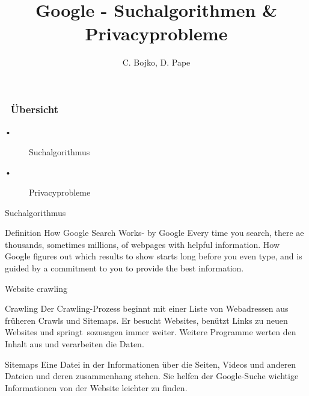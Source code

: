 \documentclass[11pt]{beamer}
\begin{document}
    \author{C. Bojko, D. Pape}
    \title{\textbf{Google - Suchalgorithmen \& Privacyprobleme}}
    \frame[plain]{\maketitle}
    
\begin {frame}
        \frametitle{\ Übersicht}

\begin{description}
\item[•]Suchalgorithmus
\item[•]Privacyprobleme
\end{description}
\end{frame}

\begin{frame}{Suchalgorithmus}

    \begin{block}{Definition \dq How Google Search Works\dq - by Google}
    \dq Every time you search, there ae thousands, sometimes millions, of webpages with helpful information. How Google figures out which results to show starts long before you even type, and is guided by a commitment to you to provide the best information.\dq
    \end{block}
    
\end{frame}

\begin{frame}{Website \dq crawling\dq}
    \begin{block}{Crawling}
        Der Crawling-Prozess beginnt mit einer Liste von Webadressen aus früheren Crawls und Sitemaps. Er besucht Websites, benützt Links zu neuen Websites und \dq springt\dq\  sozusagen immer weiter. Weitere Programme werten den Inhalt aus und verarbeiten die Daten.
    \end{block}
    \begin{alertblock}{Sitemaps}
    Eine Datei in der Informationen über die Seiten, Videos und anderen Dateien und deren zusammenhang stehen. Sie helfen der Google-Suche wichtige Informationen von der Website leichter zu finden.
    \end{alertblock}
\end{frame}
\end{document}

